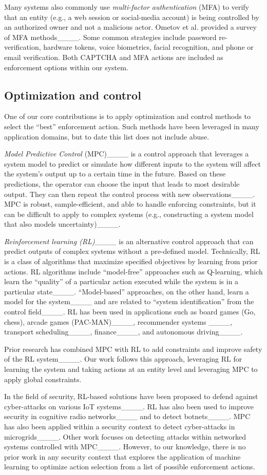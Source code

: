 Many systems also commonly use {\em multi-factor authentication} (MFA) to verify that an entity (e.g., a web session or social-media account) is being controlled by an authorized owner and not a malicious actor. Ometov et al. provided a survey of MFA methods____. Some common strategies include password re-verification, hardware tokens, voice biometrics, facial recognition, and phone or email verification. Both CAPTCHA and MFA actions are included as enforcement options within our system.

\subsection{Optimization and control}

One of our core contributions is to apply optimization and control methods to select the ``best'' enforcement action. Such methods have been leveraged in many application domains, but to date this list does not include \osn abuse.

{\em Model Predictive Control} (MPC)____ is a control approach that leverages a system model to predict or simulate how different inputs to the system will affect the system's output up to a certain time in the future. Based on these predictions, the operator can choose the  input that leads to most desirable output. They can then repeat the control process with new observations____. MPC is robust, sample-efficient, and able to handle enforcing constraints, but it can be difficult to apply to complex systems (e.g., constructing a system model that also models uncertainty)____. 

{\em Reinforcement learning (RL)}____ is an alternative control approach that can predict outputs of complex systems without a pre-defined model. Technically, RL is a class of algorithms that maximize specified objectives by learning from prior actions. RL algorithms include ``model-free'' approaches such as Q-learning, which learn the ``quality'' of a particular action executed while the system is in a particular state____. ``Model-based'' approaches, on the other hand, learn a model for the system____ and are related to ``system identification'' from the control field____. RL has been used in applications such as board games (Go, chess), arcade games (PAC-MAN)____, recommender systems ____, transport scheduling____, finance____, and autonomous driving____.

Prior research has combined MPC with RL to add constraints and improve safety of the RL system____. Our work follows this approach, leveraging RL for learning the system and taking actions at an entity level and leveraging MPC to apply global constraints.

In the field of security, RL-based solutions have been proposed to defend against cyber-attacks on various IoT systems____. RL has also been used to improve security in cognitive radio networks____ and to detect botnets____. MPC has also been applied within a security context to detect cyber-attacks in microgrids____. Other work focuses on detecting attacks within networked systems controlled with MPC____. However, to our knowledge, there is no prior work in any security context that explores the application of machine learning to optimize action selection from a list of possible enforcement actions.